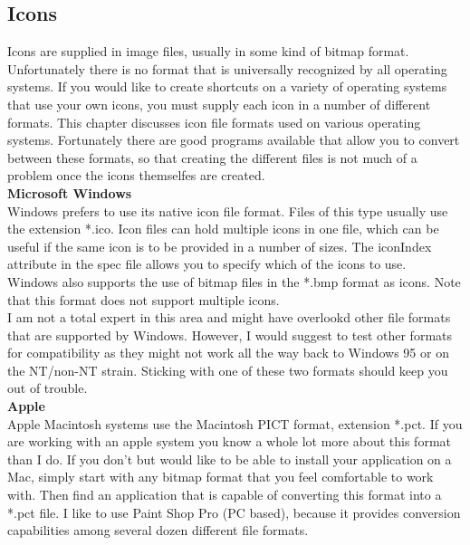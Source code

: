 \subsection{Icons}

Icons are supplied in image files, usually in some kind of bitmap
format. Unfortunately there is no format that is universally recognized
by all operating systems. If you would like to create shortcuts on a
variety of operating systems that use your own icons, you must supply
each icon in a number of different formats. This chapter discusses icon
file formats used on various operating systems. Fortunately there are
good programs available that allow you to convert between these formats,
so that creating the different files is not much of a problem once the
icons themselfes are created.\\

\textbf{Microsoft Windows}\\

Windows prefers to use its native icon file format. Files of this type
usually use the extension *.ico. Icon files can hold multiple icons in
one file, which can be useful if the same icon is to be provided in a
number of sizes. The iconIndex attribute in the spec file allows you to
specify which of the icons to use.\\

Windows also supports the use of bitmap files in the *.bmp format as
icons. Note that this format does not support multiple icons.\\

I am not a total expert in this area and might have overlookd other file
formats that are supported by Windows. However, I would suggest to test
other formats for compatibility as they might not work all the way back
to Windows 95 or on the NT/non-NT strain. Sticking with one of these two
formats should keep you out of trouble.\\

\textbf{Apple}\\

Apple Macintosh systems use the Macintosh PICT format, extension *.pct.
If you are working with an apple system you know a whole lot more about
this format than I do. If you don't but would like to be able to install
your application on a Mac, simply start with any bitmap format that you
feel comfortable to work with. Then find an application that is capable
of converting this format into a *.pct file. I like to use Paint Shop
Pro (PC based), because it provides conversion capabilities among
several dozen different file formats.\\

